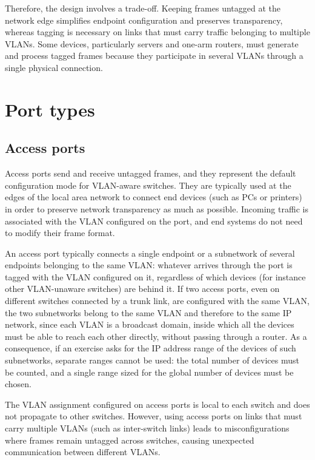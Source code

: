 Therefore, the design involves a trade-off. Keeping frames untagged at the network edge simplifies endpoint configuration and preserves transparency, whereas tagging is necessary on links that must carry traffic belonging to multiple VLANs. Some devices, particularly servers and one-arm routers, must generate and process tagged frames because they participate in several VLANs through a single physical connection.
\section{Port types}

\subsection{Access ports}

Access ports send and receive untagged frames, and they represent the default configuration mode for VLAN-aware switches. They are typically used at the edges of the local area network to connect end devices (such as PCs or printers) in order to preserve network transparency as much as possible. Incoming traffic is associated with the VLAN configured on the port, and end systems do not need to modify their frame format.

An access port typically connects a single endpoint or a subnetwork of several endpoints belonging to the same VLAN: whatever arrives through the port is tagged with the VLAN configured on it, regardless of which devices (for instance other VLAN-unaware switches) are behind it. If two access ports, even on different switches connected by a trunk link, are configured with the same VLAN, the two subnetworks belong to the same VLAN and therefore to the same IP network, since each VLAN is a broadcast domain, inside which all the devices must be able to reach each other directly, without passing through a router. As a consequence, if an exercise asks for the IP address range of the devices of such subnetworks, separate ranges cannot be used: the total number of devices must be counted, and a single range sized for the global number of devices must be chosen.


The VLAN assignment configured on access ports is local to each switch and does not propagate to other switches. However, using access ports on links that must carry multiple VLANs (such as inter-switch links) leads to misconfigurations where frames remain untagged across switches, causing unexpected communication between different VLANs.


